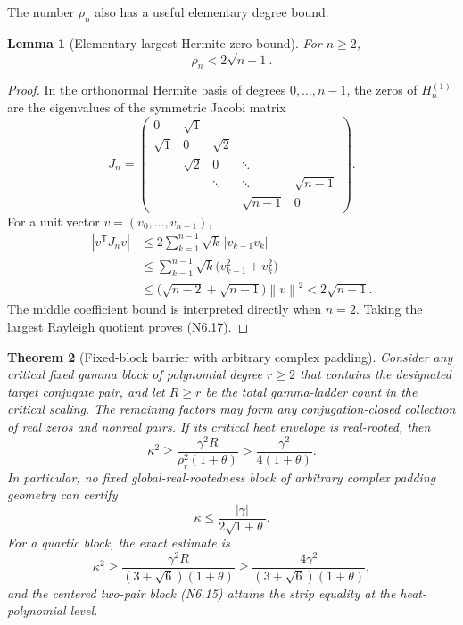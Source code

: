 \documentclass[11pt]{article}
\newtheorem{theorem}{Theorem}[section]
\newtheorem{lemma}[theorem]{Lemma}
\theoremstyle{definition}
\theoremstyle{remark}
\newcommand{\norm}[1]{\left\lVert #1\right\rVert}
\newcommand{\abs}[1]{\left\lvert #1\right\rvert}
\begin{document}
The number \(\rho_n\) also has a useful elementary degree bound.

\begin{lemma}[Elementary largest-Hermite-zero bound]
\label{lem:f2v6-rho}
For \(n\ge2\),
\[
 \rho_n<2\sqrt{n-1}.
 \tag{N6.17}
\]
\end{lemma}

\begin{proof}
In the orthonormal Hermite basis of degrees \(0,\ldots,n-1\), the zeros of
\(H_n^{(1)}\) are the eigenvalues of the symmetric Jacobi matrix
\[
 J_n=
 \begin{pmatrix}
 0&\sqrt1\\
 \sqrt1&0&\sqrt2\\
 &\sqrt2&0&\ddots\\
 &&\ddots&\ddots&\sqrt{n-1}\\
 &&&\sqrt{n-1}&0
 \end{pmatrix}.
 \tag{N6.18}
\]
For a unit vector \(v=(v_0,\ldots,v_{n-1})\),
\[
\begin{aligned}
 \abs{v^{\mathsf T}J_nv}
 &\le
 2\sum_{k=1}^{n-1}\sqrt{k}\,\abs{v_{k-1}v_k}\\
 &\le
 \sum_{k=1}^{n-1}\sqrt{k}
 \bigl(v_{k-1}^2+v_k^2\bigr)\\
 &\le
 \bigl(\sqrt{n-2}+\sqrt{n-1}\bigr)\norm{v}^2
 <2\sqrt{n-1}.
\end{aligned}
\tag{N6.19}
\]
The middle coefficient bound is interpreted directly when \(n=2\).
Taking the largest Rayleigh quotient proves \textup{(N6.17)}.
\end{proof}

\begin{theorem}[Fixed-block barrier with arbitrary complex padding]
\label{thm:f2v6-gamma}
Consider any critical fixed gamma block of polynomial degree \(r\ge2\) that
contains the designated target conjugate pair, and let \(R\ge r\) be the
total gamma-ladder count in the critical scaling.  The remaining factors
may form any conjugation-closed collection of real zeros and nonreal pairs.
If its critical heat envelope is real-rooted, then
\[
 \boxed{
 \kappa^2\ge
 \frac{\gamma^2R}{\rho_r^2(1+\theta)}
 >
 \frac{\gamma^2}{4(1+\theta)}.}
 \tag{N6.20}
\]
In particular, no fixed global-real-rootedness block of arbitrary complex
padding geometry can certify
\[
 \boxed{
 \kappa\le
 \frac{\abs{\gamma}}{2\sqrt{1+\theta}}.}
 \tag{N6.21}
\]
For a quartic block, the exact estimate is
\[
 \kappa^2\ge
 \frac{\gamma^2R}{(3+\sqrt6)(1+\theta)}
 \ge
 \frac{4\gamma^2}{(3+\sqrt6)(1+\theta)},
 \tag{N6.22}
\]
and the centered two-pair block \textup{(N6.15)} attains the strip equality
at the heat-polynomial level.
\end{theorem}
\end{document}
